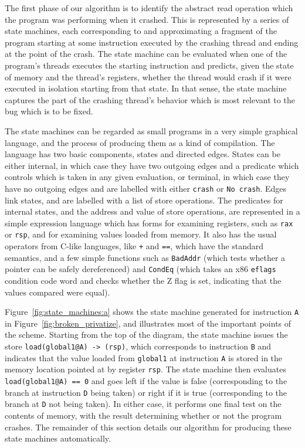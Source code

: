 \documentclass[10pt,letter,twocolumn]{sigplanconf}
\begin{document}
The first phase of our algorithm is to identify the abstract read
operation which the program was performing when it crashed.  This is
represented by a series of state machines, each corresponding to and
approximating a fragment of the program starting at some instruction
executed by the crashing thread and ending at the point of the crash.
The state machine can be evaluated when one of the program's threads
executes the starting instruction and predicts, given the state of
memory and the thread's registers, whether the thread would crash if
it were executed in isolation starting from that state.  In that
sense, the state machine captures the part of the crashing thread's
behavior which is most relevant to the bug which is to be fixed.

The state machines can be regarded as small programs in a very simple
graphical language, and the process of producing them as a kind of
compilation.  The language has two basic components, states and
directed edges.  States can be either internal, in which case they
have two outgoing edges and a predicate which controls which is taken
in any given evaluation, or terminal, in which case they have no
outgoing edges and are labelled with either \verb|crash| or
\verb|No crash|.  Edges link states, and are labelled with a list of
store operations.  The predicates for internal states, and the address
and value of store operations, are represented in a simple expression
language which has forms for examining registers, such as \verb|rax|
or \verb|rsp|, and for examining values loaded from memory.  It also
has the usual operators from C-like languages, like \verb|+| and
\verb|==|, which have the standard semantics, and a few simple
functions such as \verb|BadAddr| (which tests whether a pointer can be
safely dereferenced) and \verb|CondEq| (which takes an x86
\verb|eflags| condition code word and checks whether the Z flag is
set, indicating that the values compared were equal).

Figure~\ref{fig:state_machines:a} shows the state machine generated
for instruction \verb|A| in Figure~\ref{fig:broken_privatize}, and
illustrates most of the important points of the scheme.  Starting from
the top of the diagram, the state machine issues the store
\verb|load(global1@A) -> (rsp)|, which corresponds to instruction
\verb|B| and indicates that the value loaded from \verb|global1| at
instruction \verb|A| is stored in the memory location pointed at by
register \verb|rsp|.  The state machine then evaluates
\verb|load(global1@A) == 0| and goes left if the value is false
(corresponding to the branch at instruction \verb|D| being taken) or
right if it is true (corresponding to the branch at \verb|D| not being
taken).  In either case, it performs one final test on the contents of
memory, with the result determining whether or not the program
crashes.  The remainder of this section details our algorithm for
producing these state machines automatically.
\end{document}
